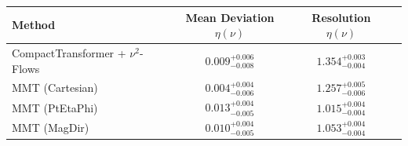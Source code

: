     \begin{tabular}{lccc}
        \toprule
        Method & Mean Deviation $\eta({\nu})$ & Resolution $\eta({\nu})$ \\
        \midrule
        CompactTransformer + $\nu^2$-Flows & $0.009^{+0.006}_{-0.008}$ & $1.354^{+0.003}_{-0.004}$ \\
        MMT (Cartesian) & $0.004^{+0.004}_{-0.006}$ & $1.257^{+0.005}_{-0.006}$ \\
        MMT (PtEtaPhi) & $0.013^{+0.004}_{-0.005}$ & $1.015^{+0.004}_{-0.004}$ \\
        MMT (MagDir) & $0.010^{+0.004}_{-0.005}$ & $1.053^{+0.004}_{-0.004}$ \\
        \bottomrule
    \end{tabular}